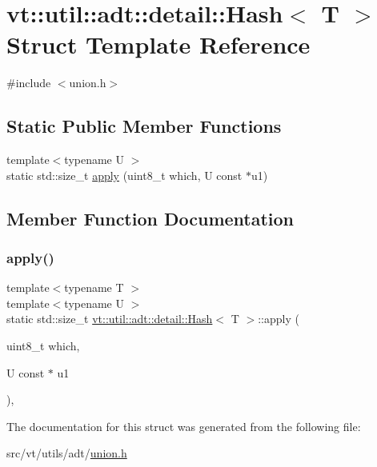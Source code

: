 \hypertarget{structvt_1_1util_1_1adt_1_1detail_1_1_hash_3_01_t_01_4}{}\section{vt\+:\+:util\+:\+:adt\+:\+:detail\+:\+:Hash$<$ T $>$ Struct Template Reference}
\label{structvt_1_1util_1_1adt_1_1detail_1_1_hash_3_01_t_01_4}


{\ttfamily \#include $<$union.\+h$>$}

\subsection*{Static Public Member Functions}
\begin{DoxyCompactItemize}
\item 
{\footnotesize template$<$typename U $>$ }\\static std\+::size\+\_\+t \hyperlink{structvt_1_1util_1_1adt_1_1detail_1_1_hash_3_01_t_01_4_a209b846609fc67d54a1cbce7f76f438a}{apply} (uint8\+\_\+t which, U const $\ast$u1)
\end{DoxyCompactItemize}


\subsection{Member Function Documentation}
\mbox{\label{structvt_1_1util_1_1adt_1_1detail_1_1_hash_3_01_t_01_4_a209b846609fc67d54a1cbce7f76f438a}} 
\subsubsection{\texorpdfstring{apply()}{apply()}}
{\footnotesize\ttfamily template$<$typename T $>$ \\
template$<$typename U $>$ \\
static std\+::size\+\_\+t \hyperlink{structvt_1_1util_1_1adt_1_1detail_1_1_hash}{vt\+::util\+::adt\+::detail\+::\+Hash}$<$ T $>$\+::apply (\begin{DoxyParamCaption}\item[{uint8\+\_\+t}]{which,  }\item[{U const $\ast$}]{u1 }\end{DoxyParamCaption})\hspace{0.3cm}{\ttfamily [inline]}, {\ttfamily [static]}}



The documentation for this struct was generated from the following file\+:\begin{DoxyCompactItemize}
\item 
src/vt/utils/adt/\hyperlink{union_8h}{union.\+h}\end{DoxyCompactItemize}
